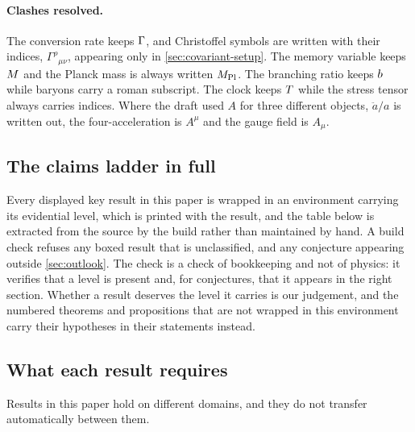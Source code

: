 \paragraph{Clashes resolved.} The conversion rate keeps $\Gamma$, and Christoffel
symbols are written with their indices, $\Gamma^{\rho}{}_{\mu\nu}$, appearing
only in \cref{sec:covariant-setup}. The memory variable keeps $M$ and the
Planck mass is always written $M_{\mathrm{Pl}}$. The branching ratio keeps $b$ while
baryons carry a roman subscript. The clock keeps $T$ while the stress
tensor always carries indices. Where the draft used $A$ for three different
objects, $\ddot a/a$ is written out, the four-acceleration is $A^\mu$ and the
gauge field is $A_\mu$.

\subsection{The claims ladder in full}\label{app:conventions-ladder}

Every displayed key result in this paper is wrapped in an environment carrying
its evidential level, which is printed with the result, and the
table below is extracted from the source by the build rather than maintained by
hand. A build check refuses any boxed result that is unclassified, and any
conjecture appearing outside \cref{sec:outlook}. The check is a check of
bookkeeping and not of physics: it verifies that a level is present and, for
conjectures, that it appears in the right section. Whether a result deserves
the level it carries is our judgement, and the numbered theorems and
propositions that are not wrapped in this environment carry their hypotheses in
their statements instead.

\begingroup\footnotesize

\endgroup

\subsection{What each result requires}\label{app:conventions-domain}

Results in this paper hold on different domains, and they do not transfer
automatically between them.

